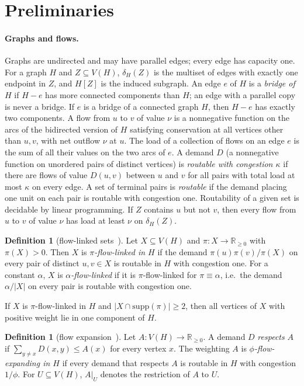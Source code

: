 \documentclass[11pt,letterpaper]{article}
\theoremstyle{definition}
\newtheorem{definition}[theorem]{Definition}
\newcommand{\R}{\mathbb{R}}
\begin{document}
\section{Preliminaries}\label{sec:prelim}

\paragraph{Graphs and flows.}
Graphs are undirected and may have parallel edges; every edge has capacity one. For a graph
$H$ and $Z\subseteq V(H)$, $\delta_H(Z)$ is the multiset of edges with exactly one endpoint in
$Z$, and $H[Z]$ is the induced subgraph. An edge $e$ of $H$ is a \emph{bridge of $H$} if
$H-e$ has more connected components than $H$; an edge with a parallel copy is never a bridge.
If $e$ is a bridge of a connected graph $H$, then $H-e$ has exactly two components.
A flow from $u$ to $v$ of value $\nu$ is a nonnegative function on the arcs of the
bidirected version of $H$ satisfying conservation at all vertices other than $u,v$, with net
outflow $\nu$ at $u$. The load of a collection of flows on an edge $e$ is the sum of all
their values on the two arcs of $e$. A demand $D$ (a nonnegative function on unordered pairs
of distinct vertices) is \emph{routable with congestion $\kappa$} if there are flows of value
$D(u,v)$ between $u$ and $v$ for all pairs with total load at most $\kappa$ on every edge. A
set of terminal pairs is \emph{routable} if the demand placing one unit on each pair is
routable with congestion one. Routability of a given set is decidable by linear programming.
If $Z$ contains $u$ but not $v$, then every flow from $u$ to $v$ of value $\nu$ has load at
least $\nu$ on $\delta_H(Z)$.

\begin{definition}[flow-linked sets~\cite{CKS05}]
Let $X\subseteq V(H)$ and $\pi:X\to\R_{\ge0}$ with $\pi(X)>0$. Then $X$ is
\emph{$\pi$-flow-linked in $H$} if the demand $\pi(u)\pi(v)/\pi(X)$ on every pair of distinct
$u,v\in X$ is routable in $H$ with congestion one. For a constant $\alpha$, $X$ is
\emph{$\alpha$-flow-linked} if it is $\pi$-flow-linked for $\pi\equiv\alpha$, i.e.\ the
demand $\alpha/|X|$ on every pair is routable with congestion one.
\end{definition}

If $X$ is $\pi$-flow-linked in $H$ and $|X\cap\mathrm{supp}(\pi)|\ge2$, then all vertices of
$X$ with positive weight lie in one component of $H$.

\begin{definition}[flow expansion~\cite{BJS26}]
Let $A:V(H)\to\R_{\ge0}$. A demand $D$ \emph{respects} $A$ if
$\sum_{y\ne x}D(x,y)\le A(x)$ for every vertex $x$. The weighting $A$ is
\emph{$\phi$-flow-expanding in $H$} if every demand that respects $A$ is routable in $H$ with
congestion $1/\phi$. For $U\subseteq V(H)$,
$A|_U$ denotes the restriction of $A$ to $U$.
\end{definition}
\end{document}
